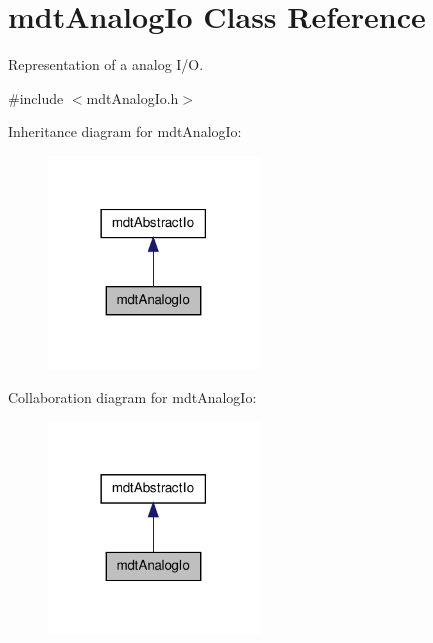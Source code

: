 \hypertarget{classmdt_analog_io}{
\section{mdtAnalogIo Class Reference}
\label{classmdt_analog_io}
}


Representation of a analog I/O.  




{\ttfamily \#include $<$mdtAnalogIo.h$>$}



Inheritance diagram for mdtAnalogIo:
\nopagebreak
\begin{figure}[H]
\begin{center}
\leavevmode
\includegraphics[width=158pt]{classmdt_analog_io__inherit__graph}
\end{center}
\end{figure}


Collaboration diagram for mdtAnalogIo:
\nopagebreak
\begin{figure}[H]
\begin{center}
\leavevmode
\includegraphics[width=158pt]{classmdt_analog_io__coll__graph}
\end{center}
\end{figure}
